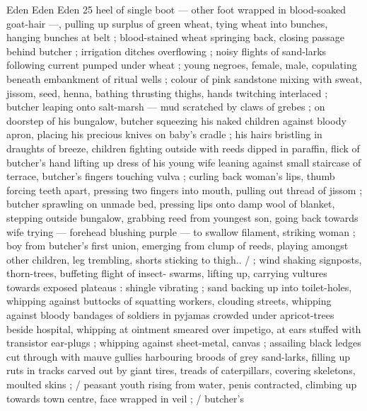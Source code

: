 Eden Eden Eden 25
heel of single boot — other foot wrapped in blood-soaked goat-hair
—, pulling up surplus of green wheat, tying wheat into bunches,
hanging bunches at belt ; blood-stained wheat springing back,
closing passage behind butcher ; irrigation ditches overflowing ;
noisy flights of sand-larks following current pumped under wheat ;
young negroes, female, male, copulating beneath embankment of
ritual wells ; colour of pink sandstone mixing with sweat, jissom,
seed, henna, bathing thrusting thighs, hands twitching interlaced ;
butcher leaping onto salt-marsh — mud scratched by claws of
grebes ; on doorstep of his bungalow, butcher squeezing his naked
children against bloody apron, placing his precious knives on baby's
cradle ; his hairs bristling in draughts of breeze, children fighting
outside with reeds dipped in paraffin, flick of butcher's hand lifting
up dress of his young wife leaning against small staircase of terrace,
butcher's fingers touching vulva ; curling back woman's lips, thumb
forcing teeth apart, pressing two fingers into mouth, pulling out
thread of jissom ; butcher sprawling on unmade bed, pressing lips
onto damp wool of blanket, stepping outside bungalow, grabbing
reed from youngest son, going back towards wife trying — forehead
blushing purple — to swallow filament, striking woman ; boy from
butcher's first union, emerging from clump of reeds, playing
amongst other children, leg trembling, shorts sticking to thigh.. / ;
wind shaking signposts, thorn-trees, buffeting flight of insect-
swarms, lifting up, carrying vultures towards exposed plateaus :
shingle vibrating ; sand backing up into toilet-holes, whipping
against buttocks of squatting workers, clouding streets, whipping
against bloody bandages of soldiers in pyjamas crowded under
apricot-trees beside hospital, whipping at ointment smeared over
impetigo, at ears stuffed with transistor ear-plugs ; whipping against
sheet-metal, canvas ; assailing black ledges cut through with mauve
gullies harbouring broods of grey sand-larks, filling up ruts in tracks
carved out by giant tires, treads of caterpillars, covering skeletons,
moulted skins ; / peasant youth rising from water, penis contracted,
climbing up towards town centre, face wrapped in veil ; / butcher's

